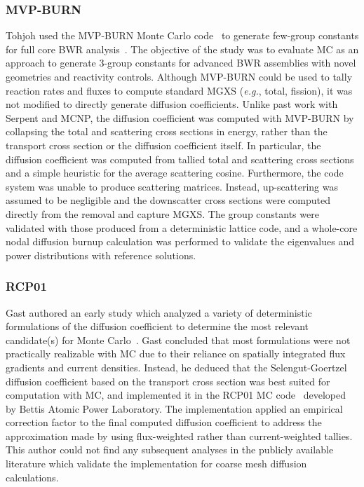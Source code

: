 \subsubsection{MVP-BURN}
\label{subsec:chap3-lit-review-diffusion-mvp-burn}

Tohjoh used the MVP-BURN Monte Carlo code~\cite{okumura2000validation} to generate few-group constants for full core \ac{BWR} analysis~\cite{tohjoh2005application}. The objective of the study was to evaluate \ac{MC} as an approach to generate 3-group constants for advanced \ac{BWR} assemblies with novel geometries and reactivity controls. Although MVP-BURN could be used to tally reaction rates and fluxes to compute standard \ac{MGXS} (\textit{e.g.}, total, fission), it was not modified to directly generate diffusion coefficients. Unlike past work with Serpent and MCNP, the diffusion coefficient was computed with MVP-BURN by collapsing the total and scattering cross sections in energy, rather than the transport cross section or the diffusion coefficient itself. In particular, the diffusion coefficient was computed from tallied total and scattering cross sections and a simple heuristic for the average scattering cosine. Furthermore, the code system was unable to produce scattering matrices. Instead, up-scattering was assumed to be negligible and the downscatter cross sections were computed directly from the removal and capture \ac{MGXS}. The group constants were validated with those produced from a deterministic lattice code, and a whole-core nodal diffusion burnup calculation was performed to validate the eigenvalues and power distributions with reference solutions.

\subsubsection{RCP01}
\label{subsec:chap3-lit-review-diffusion-rcp01}

Gast authored an early study which analyzed a variety of deterministic formulations of the diffusion coefficient to determine the most relevant candidate(s) for Monte Carlo~\cite{gast1981procedure}. Gast concluded that most formulations were not practically realizable with \ac{MC} due to their reliance on spatially integrated flux gradients and current densities. Instead, he deduced that the Selengut-Goertzel diffusion coefficient based on the transport cross section was best suited for computation with \ac{MC}, and implemented it in the RCP01 \ac{MC} code~\cite{ondis2000rcp01} developed by Bettis Atomic Power Laboratory. The implementation applied an empirical correction factor to the final computed diffusion coefficient to address the approximation made by using flux-weighted rather than current-weighted tallies. This author could not find any subsequent analyses in the publicly available literature which validate the implementation for coarse mesh diffusion calculations.

